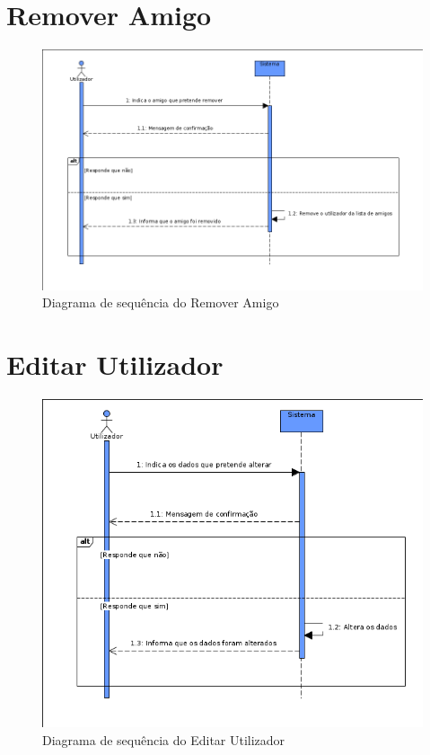 \documentclass[a4paper]{report}
\begin{document}
\section{Remover Amigo}

\begin{figure}[H]
	\centering 
    \includegraphics[width=\textwidth]{images/remamigoSeq.png}  
    \caption{Diagrama de sequência do Remover Amigo}
\end{figure}

\section{Editar Utilizador}

\begin{figure}[H]
	\centering 
    \includegraphics[width=\textwidth]{images/edituserSeq.png}  
    \caption{Diagrama de sequência do Editar Utilizador}
\end{figure}
\end{document}
